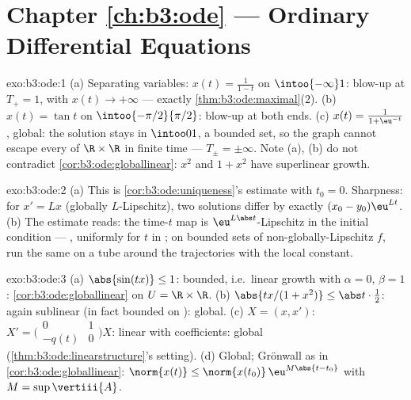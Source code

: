 \section*{Chapter \ref{ch:b3:ode} --- Ordinary Differential
Equations}

\begin{solution}{exo:b3:ode:1}
(a) Separating variables: $x(t) = \frac1{1 - t}$ on
$\intoo{-\infty}1$: blow-up at $T_+ = 1$, with $x(t) \to
+\infty$ --- exactly \cref{thm:b3:ode:maximal}(2).
(b) $x(t) = \tan t$ on $\intoo{-\pi/2}{\pi/2}$: blow-up at
both ends.
(c) $x(t) = \frac{1}{1 + \eu^{-t}}$, global: the solution
stays in $\intoo01$, a bounded set, so the graph cannot
escape every  of $\R\times\R$ in finite time --- $T_\pm
= \pm\infty$. Note (a), (b) do not contradict
\cref{cor:b3:ode:globallinear}: $x^2$ and $1 + x^2$ have
superlinear growth.
\end{solution}

\begin{solution}{exo:b3:ode:2}
(a) This is \cref{cor:b3:ode:uniqueness}'s estimate with $t_0
= 0$. Sharpness: for $x' = Lx$ (globally $L$-Lipschitz), two
solutions differ by exactly $(x_0 - y_0)\eu^{Lt}$.
(b) The estimate reads: the time-$t$  map is
$\eu^{L\abs t}$-Lipschitz in the initial condition ---
, uniformly for $t$ in ; on bounded sets of
non-globally-Lipschitz $f$, run the same on a  tube
around the trajectories with the local constant.
\end{solution}

\begin{solution}{exo:b3:ode:3}
(a) $\abs{\sin(tx)} \leq 1$: bounded, i.e.\ linear growth with
$\alpha = 0$, $\beta = 1$: \cref{cor:b3:ode:globallinear} on
$U = \R\times\R$.
(b) $\abs{tx/(1 + x^2)} \leq \abs t\cdot\frac12$: again
sublinear (in fact bounded on ): global.
(c) $X = (x, x')$: $X' = \bigl(\begin{smallmatrix}0 & 1\\ -q(t)
& 0\end{smallmatrix}\bigr)X$: linear with 
coefficients: global (\cref{thm:b3:ode:linearstructure}'s
setting).
(d) Global; Gr\"onwall as in \cref{cor:b3:ode:globallinear}:
$\norm{x(t)} \leq \norm{x(t_0)}\,\eu^{M\abs{t - t_0}}$ with
$M = \sup\vertiii{A}$.
\end{solution}

